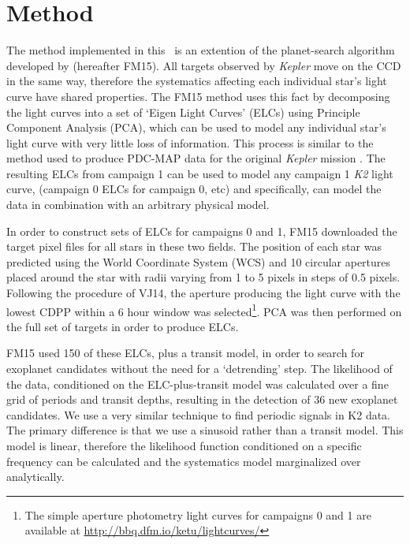 \section{Method}
\label{sec:Method}

The method implemented in this \article\ is an extention of the planet-search
algorithm developed by \citet{Foreman-Mackey2015} (hereafter FM15).
All targets observed by {\it Kepler} move on the CCD in the same way,
therefore the systematics affecting each individual star's light curve have
shared properties.
The FM15 method uses this fact by decomposing the light curves into a set
of `Eigen Light Curves' (ELCs) using Principle Component Analysis (PCA), which
can be used to model any individual star's light curve with very little loss
of information.
This process is similar to the method used to produce PDC-MAP data for the
original {\it Kepler} mission \citep[][]{Stumpe2012, Smith2012}.
The resulting ELCs from campaign 1 can be used to model any campaign 1 {\it
K2} light curve, (campaign 0 ELCs for campaign 0, etc) and specifically, can
model the data in combination with an arbitrary physical model.

In order to construct sets of ELCs for campaigns 0 and 1, FM15 downloaded the
target pixel files for all stars in these two fields.
The position of each star was predicted using the World Coordinate System (WCS)
and 10 circular apertures placed around the star with radii varying from 1 to
5 pixels in steps of 0.5 pixels.
Following the procedure of VJ14, the aperture producing the
light curve with the lowest CDPP within a 6 hour window
\citep{Christiansen2012} was selected\footnote{The simple aperture photometry
light curves for campaigns 0 and 1 are available at
\url{http://bbq.dfm.io/ketu/lightcurves/}}.
PCA was then performed on the full set of targets in order to produce ELCs.

FM15 used 150 of these ELCs, plus a transit model, in order to
search for exoplanet candidates without the need for a `detrending' step.
The likelihood of the data, conditioned on the ELC-plus-transit
model was calculated over a fine grid of periods and transit depths, resulting
in the detection of 36 new exoplanet candidates.
We use a very similar technique to find periodic signals in K2 data.
The primary difference is that we use a sinusoid rather than a transit model.
This model is linear, therefore the likelihood function conditioned on
a specific frequency can be calculated and the systematics model marginalized
over analytically.

